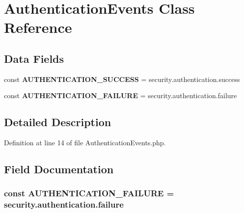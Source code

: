 \section{Authentication\+Events Class Reference}
\label{class_symfony_1_1_component_1_1_security_1_1_core_1_1_authentication_events}
\subsection*{Data Fields}
\begin{DoxyCompactItemize}
\item 
const {\bf A\+U\+T\+H\+E\+N\+T\+I\+C\+A\+T\+I\+O\+N\+\_\+\+S\+U\+C\+C\+E\+S\+S} = \textquotesingle{}security.\+authentication.\+success\textquotesingle{}
\item 
const {\bf A\+U\+T\+H\+E\+N\+T\+I\+C\+A\+T\+I\+O\+N\+\_\+\+F\+A\+I\+L\+U\+R\+E} = \textquotesingle{}security.\+authentication.\+failure\textquotesingle{}
\end{DoxyCompactItemize}


\subsection{Detailed Description}


Definition at line 14 of file Authentication\+Events.\+php.



\subsection{Field Documentation}
\subsubsection[{A\+U\+T\+H\+E\+N\+T\+I\+C\+A\+T\+I\+O\+N\+\_\+\+F\+A\+I\+L\+U\+R\+E}]{\setlength{\rightskip}{0pt plus 5cm}const A\+U\+T\+H\+E\+N\+T\+I\+C\+A\+T\+I\+O\+N\+\_\+\+F\+A\+I\+L\+U\+R\+E = \textquotesingle{}security.\+authentication.\+failure\textquotesingle{}}\label{class_symfony_1_1_component_1_1_security_1_1_core_1_1_authentication_events_a0af383965a468874665976e24d9dd5ad}


